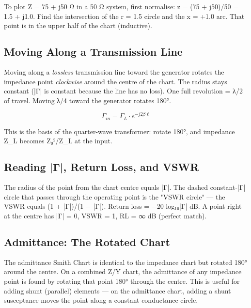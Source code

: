       

To plot Z = 75 + j50 Ω in a 50 Ω system, first normalise: z = (75 + j50)/50 = 1.5 + j1.0. Find the intersection of the r = 1.5 circle and the x = +1.0 arc. That point is in the upper half of the chart (inductive).

      

\subsection{Moving Along a Transmission Line}

      

Moving along a \emph{lossless} transmission line toward the generator rotates the impedance point \emph{clockwise} around the centre of the chart. The radius stays constant (|Γ| is constant because the line has no loss). One full revolution = λ/2 of travel. Moving λ/4 toward the generator rotates 180°.


      
\[\Gamma_{in} = \Gamma_L \cdot e^{-j2\beta\ell}\]

      

This is the basis of the quarter-wave transformer: rotate 180°, and impedance Z\_L becomes Z₀²/Z\_L at the input.

      

\subsection{Reading |Γ|, Return Loss, and VSWR}

      

The radius of the point from the chart centre equals |Γ|. The dashed constant-|Γ| circle that passes through the operating point is the "VSWR circle" — the VSWR equals (1 + |Γ|)/(1 − |Γ|). Return loss = −20 log₁₀|Γ| dB. A point right at the centre has |Γ| = 0, VSWR = 1, RL = ∞ dB (perfect match).

      

\subsection{Admittance: The Rotated Chart}

      

The admittance Smith Chart is identical to the impedance chart but rotated 180° around the centre. On a combined Z/Y chart, the admittance of any impedance point is found by rotating that point 180° through the centre. This is useful for adding shunt (parallel) elements — on the admittance chart, adding a shunt susceptance moves the point along a constant-conductance circle.

